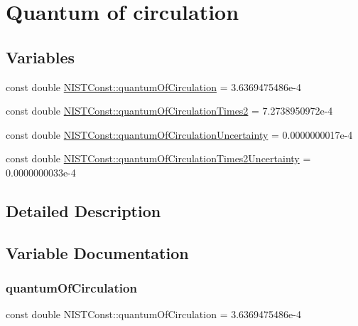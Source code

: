 \hypertarget{group___quantum_of_circulation}{}\section{Quantum of circulation}
\label{group___quantum_of_circulation}
\subsection*{Variables}
\begin{DoxyCompactItemize}
\item 
const double \hyperlink{group___quantum_of_circulation_ga7dbe55704b9a968adfc99d60f5d2dd11}{N\+I\+S\+T\+Const\+::quantum\+Of\+Circulation} = 3.\+6369475486e-\/4
\item 
const double \hyperlink{group___quantum_of_circulation_ga86d150a3f178c37f565f6498cf593dbe}{N\+I\+S\+T\+Const\+::quantum\+Of\+Circulation\+Times2} = 7.\+2738950972e-\/4
\item 
const double \hyperlink{group___quantum_of_circulation_ga80150c0be4cb14a65256b57d1d0c8eb5}{N\+I\+S\+T\+Const\+::quantum\+Of\+Circulation\+Uncertainty} = 0.\+0000000017e-\/4
\item 
const double \hyperlink{group___quantum_of_circulation_gaf5959a1757bc97cebdde9530a370ada3}{N\+I\+S\+T\+Const\+::quantum\+Of\+Circulation\+Times2\+Uncertainty} = 0.\+0000000033e-\/4
\end{DoxyCompactItemize}


\subsection{Detailed Description}


\subsection{Variable Documentation}
\mbox{\label{group___quantum_of_circulation_ga7dbe55704b9a968adfc99d60f5d2dd11}} 
\subsubsection{\texorpdfstring{quantum\+Of\+Circulation}{quantumOfCirculation}}
{\footnotesize\ttfamily const double N\+I\+S\+T\+Const\+::quantum\+Of\+Circulation = 3.\+6369475486e-\/4}


